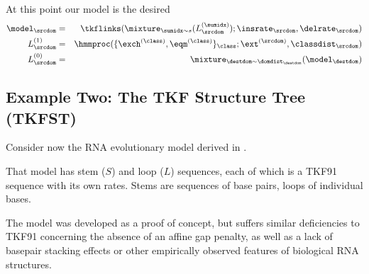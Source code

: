 At this point our model is the desired
\begin{eqnarray*}
\model_\srcdom & = &
\tkflinks(\mixture_{\sumidx\sim\tok}(L^{(\sumidx)}_\srcdom);\insrate_\srcdom,\delrate_\srcdom)
\\
L^{(1)}_\srcdom & = & \hmmproc(\{\exch^{(\class)},\eqm^{(\class)}\}_\class;\ext^{(\srcdom)},\classdist_\srcdom) \\
L^{(0)}_\srcdom & = & \mixture_{\destdom\sim\domdist_\destdom}(\model_\destdom)
\end{eqnarray*}


\subsection{Example Two: The TKF Structure Tree (TKFST)}

Consider now the RNA evolutionary model derived in 
\cite{Holmes2004}.

That model has stem ($S$) and loop ($L$) sequences, each of which is a TKF91 sequence with its own rates.
Stems are sequences of base pairs, loops of individual bases.

The model was developed as a proof of concept, but suffers similar deficiencies to TKF91 concerning the absence of an affine gap penalty,
as well as a lack of basepair stacking effects or other empirically observed features of biological RNA structures.

\newcommand\ruletable[3]{
\begin{tabular}{rcc|rrr}
\multicolumn{6}{l}{\em #1} \\
\multicolumn{6}{l}{\em #2}\\
#3
\end{tabular}
}
\newcommand\tkfstruletable[3]{\ruletable{TKF Structure Tree #1}{#2}{#3}}

\newcommand\lhsrhs[5]{ #1 & $\to$ & #2 & #3 & #4 & #5 \\ }
\newcommand\rhs[4]{       &   $|$ & #1 & #2 & #3 & #4 \\ }
\newcommand\blank{ & & & & & \\ }


\newcommand\singletgrammar[3]{
\tkfstruletable{singlet rules ($#1$)}
{Sequence $#1$ terminals: $\{ #2, #3 \}$.}
{
\lhsrhs{ lhs }{ rhs }{ $P(#1)$ }{  }{  }
\hline

\blank
\lhsrhs{ $L_{#1}$ }{ ${#2}\ L_{#1}$ }{ $\kappa_l \pi_l(#2)$ }{  }{  }
\rhs{ $S_{#1}\ L_{#1}$ }{ $\kappa_l \pi_l(S)$ }{  }{  }

\rhs{ $\epsilon$ }{ $1-\kappa_l$ }{  }{  }

\blank
\lhsrhs{ $S_{#1}$ }{ ${#2}\ S_{#1}\ {#3}$ }{ $\kappa_s \pi_s(#2#3)$ }{  }{  }
\rhs{ $L_{#1}$ }{ $1-\kappa_s$ }{  }{  }
}
}  %



